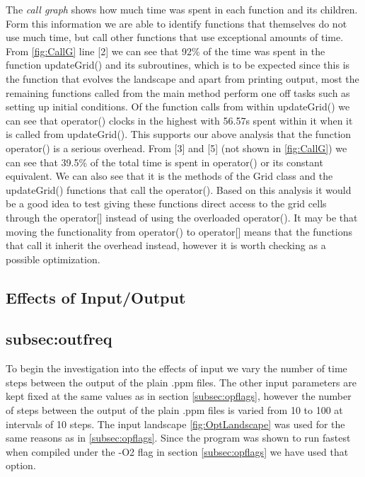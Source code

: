 The \textit{call graph} shows how much time was spent in each function and its children. Form this information we are able to identify functions that themselves do not use much time, but call other functions that use exceptional amounts of time. From \ref{fig:CallG} line [2] we can see that 92\% of the time was spent in the function updateGrid() and its subroutines, which is to be expected since this is the function that evolves the landscape and apart from printing output, most the remaining functions called from the main method perform one off tasks such as setting up initial conditions. Of the function calls from within updateGrid() we can see that operator() clocks in the highest with 56.57s spent within it when it is called from updateGrid(). This supports our above analysis that the function operator() is a serious overhead. From [3] and [5] (not shown in \ref{fig:CallG}) we can see that 39.5\% of the total time is spent in operator() or its constant equivalent. We can also see that it is the methods of the Grid class and the updateGrid() functions that call the operator(). Based on this analysis it would be a good idea to test giving these functions direct access to the grid cells through the operator[] instead of using the overloaded operator(). It may be that moving the functionality from operator() to operator[] means that the functions that call it inherit the overhead instead, however it is worth checking as a possible optimization. 




\subsection{Effects of Input/Output}
\label{subsec:input}

\subsection{subsec:outfreq}
To begin the investigation into the effects of input we vary the number of time steps between the output of the plain .ppm files. The other input parameters are kept fixed at the same values as in section \ref{subsec:opflags}, however the number of steps between the output of the plain .ppm files is varied from 10 to 100 at intervals of 10 steps. The input landscape \ref{fig:OptLandscape} was used for the same reasons as in \ref{subsec:opflags}. Since the program was shown to run fastest when compiled under the -O2 flag in section \ref{subsec:opflags} we have used that option. 

